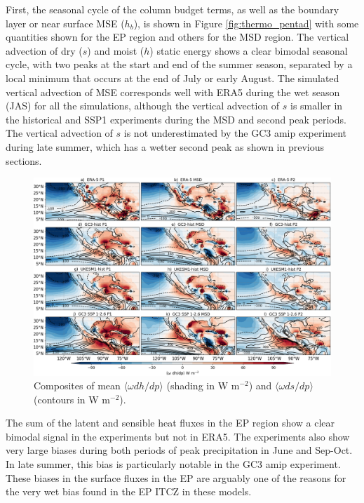   First, the seasonal cycle of the column budget terms, as well as the boundary layer or near surface MSE ($h_b$), is shown in Figure \ref{fig:thermo_pentad} with some quantities shown for the EP region and others for the MSD region. The vertical advection of dry ($s$) and moist ($h$) static energy shows a clear bimodal seasonal cycle, with two peaks at the start and end of the summer season, separated by a local minimum that occurs at the end of July or early August.
 The simulated vertical advection of MSE corresponds well with ERA5 during the wet season (JAS) for all the simulations, although the vertical advection of $s$ is smaller in the historical and SSP1 experiments during the MSD and second peak periods. The vertical advection of $s$ is not underestimated by the GC3 amip experiment during late summer, which has a wetter second peak as shown in previous sections. 

\begin{figure}[t!]
\includegraphics[width=\linewidth]{figures/thermocompositewdhdp.png}
\caption[Composites of the mean vertical advection of the MSE budget]{Composites of mean $\langle \omega dh/dp \rangle$ (shading in W m$^{-2}$) and $\langle \omega ds/dp \rangle$ (contours in W m$^{-2}$).  }
\label{fig:wdhdpcompo}
\end{figure}  
 
 The sum of the latent and sensible heat fluxes in the EP region show a clear bimodal signal in the experiments but not in ERA5. The experiments also show very large biases during both periods of peak precipitation in June and Sep-Oct. In late summer, this bias is particularly notable in the GC3 amip experiment. These biases in the surface fluxes in the EP are arguably one of the reasons for the very wet bias found in the EP ITCZ in these models. 
 
